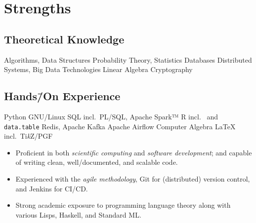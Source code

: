 \documentclass[%
version=last,%
fontsize=11pt,%
paper=A4,%
headinclude=false,%
footinclude=false,%
headlines=0,%
footlines=0,%
areasetadvanced,%
toc=bibnumbered,%
]{scrartcl}%
\begin{document}
\begin{minipage}[t]{.4\textwidth}
  \section{Strengths}%
  \label{sec:strengths}
  \subsection{Theoretical Knowledge}%
  \label{sec:theoretical-knowledge}
  \begin{UniformTCBItems}{2}
    \tcbitem{}Algorithms, Data Structures%
    \tcbitem{}Probability Theory, Statistics%
    \tcbitem{}Databases%
    \tcbitem{}Distributed Systems, Big Data Technologies%
    \tcbitem{}Linear Algebra%
    \tcbitem{}Cryptography
  \end{UniformTCBItems}

  \subsection{%
    \texorpdfstring%
    {Hands\=/On Experience}%
    {Hands-On Experience}%
  }%
  \label{sec:hands-on-experience}
  \begin{UniformTCBItems}{2}
    \tcbitem{}Python%
    \tcbitem{}GNU/Linux%
    \tcbitem{}SQL incl.\ PL/SQL, Apache Spark™%
    \tcbitem{}R incl.\  and \texttt{data.table}%
    \tcbitem{}Redis, Apache Kafka%
    \tcbitem{}Apache Airflow%
    \tcbitem{}Computer Algebra%
    \tcbitem{}\LaTeX{} incl.\ Ti\emph{k}Z/PGF
  \end{UniformTCBItems}

  \begingroup%
  \small%
  \begin{itemize}[nosep,leftmargin=*]
  \item Proficient in both \emph{scientific computing} and \emph{software
      development}; and capable of writing clean, well\-/documented, and
    scalable code.
  \item Experienced with the \emph{agile methodology}, Git for (distributed)
    version control, and Jenkins for CI/CD\@.
  \item Strong academic exposure to programming language theory along with
    various Lisps, Haskell, and Standard ML\@.
  \end{itemize}
  \endgroup


\end{minipage}
\end{document}
